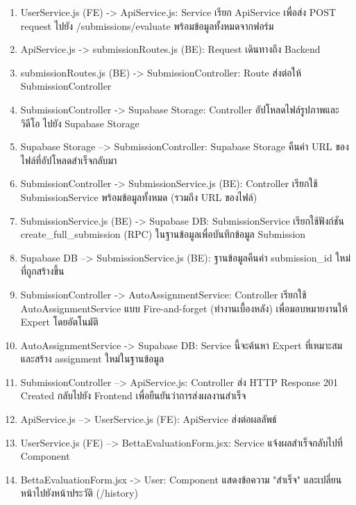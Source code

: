 \begin{sloppypar}
\begin{enumerate}
\begin{enumerate}
\begin{enumerate}
					\item UserService.js (FE) -> ApiService.js: Service เรียก ApiService เพื่อส่ง POST request ไปยัง /submissions/evaluate พร้อมข้อมูลทั้งหมดจากฟอร์ม
					\item ApiService.js -> submissionRoutes.js (BE): Request เดินทางถึง Backend
					\item submissionRoutes.js (BE) -> SubmissionController: Route ส่งต่อให้ SubmissionController
					\item SubmissionController -> Supabase Storage: Controller อัปโหลดไฟล์รูปภาพและวิดีโอ ไปยัง Supabase Storage
					\item Supabase Storage --> SubmissionController: Supabase Storage คืนค่า URL ของไฟล์ที่อัปโหลดสำเร็จกลับมา
					\item SubmissionController -> SubmissionService.js (BE): Controller เรียกใช้ SubmissionService พร้อมข้อมูลทั้งหมด (รวมถึง URL ของไฟล์)
					\item SubmissionService.js (BE) -> Supabase DB: SubmissionService เรียกใช้ฟังก์ชัน create\_full\_submission (RPC) ในฐานข้อมูลเพื่อบันทึกข้อมูล Submission
					\item Supabase DB --> SubmissionService.js (BE): ฐานข้อมูลคืนค่า submission\_id ใหม่ที่ถูกสร้างขึ้น
					\item SubmissionController -> AutoAssignmentService: Controller เรียกใช้ AutoAssignmentService แบบ Fire-and-forget (ทำงานเบื้องหลัง) เพื่อมอบหมายงานให้ Expert โดยอัตโนมัติ 
					\item AutoAssignmentService -> Supabase DB: Service นี้จะค้นหา Expert ที่เหมาะสมและสร้าง assignment ใหม่ในฐานข้อมูล
					\item SubmissionController --> ApiService.js: Controller ส่ง HTTP Response 201 Created กลับไปยัง Frontend เพื่อยืนยันว่าการส่งผลงานสำเร็จ
					\item ApiService.js --> UserService.js (FE): ApiService ส่งต่อผลลัพธ์
					\item UserService.js (FE) --> BettaEvaluationForm.jsx: Service แจ้งผลสำเร็จกลับไปที่ Component
					\item BettaEvaluationForm.jsx -> User: Component แสดงข้อความ "สำเร็จ" และเปลี่ยนหน้าไปยังหน้าประวัติ (/history)
				\end{enumerate}
		\end{enumerate}
	\end{enumerate}
\end{sloppypar}

\newpage

\vspace{\baselineskip}

